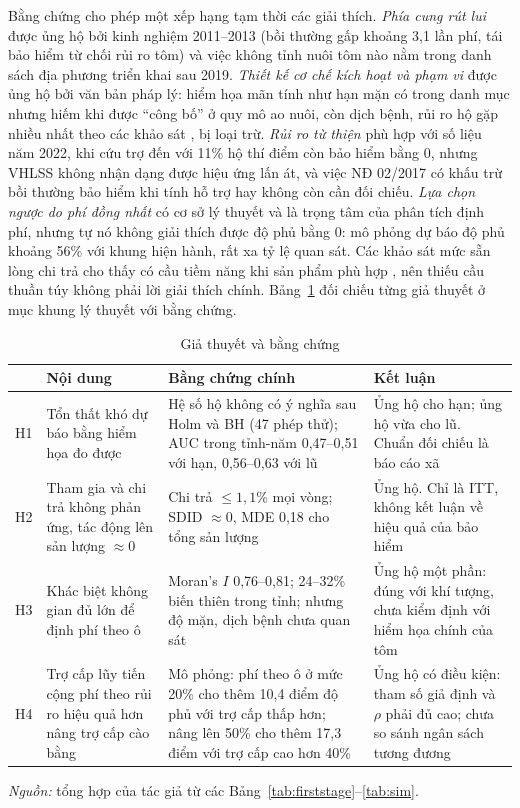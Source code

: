 \documentclass[12pt,a4paper]{article}
\begin{document}
Bằng chứng cho phép một xếp hạng tạm thời các giải thích. \textit{Phía cung rút lui} được ủng hộ bởi kinh nghiệm 2011--2013 (bồi thường gấp khoảng 3,1 lần phí, tái bảo hiểm từ chối rủi ro tôm) và việc không tỉnh nuôi tôm nào nằm trong danh sách địa phương triển khai sau 2019. \textit{Thiết kế cơ chế kích hoạt và phạm vi} được ủng hộ bởi văn bản pháp lý: hiểm họa mãn tính như hạn mặn có trong danh mục nhưng hiếm khi được ``công bố'' ở quy mô ao nuôi, còn dịch bệnh, rủi ro hộ gặp nhiều nhất theo các khảo sát \parencite{kiet2021ruiro,joffre2018}, bị loại trừ. \textit{Rủi ro từ thiện} phù hợp với số liệu năm 2022, khi cứu trợ đến với 11\% hộ thí điểm còn bảo hiểm bằng 0, nhưng VHLSS không nhận dạng được hiệu ứng lấn át, và việc NĐ 02/2017 có khấu trừ bồi thường bảo hiểm khi tính hỗ trợ hay không còn cần đối chiếu. \textit{Lựa chọn ngược do phí đồng nhất} có cơ sở lý thuyết và là trọng tâm của phân tích định phí, nhưng tự nó không giải thích được độ phủ bằng 0: mô phỏng dự báo độ phủ khoảng 56\% với khung hiện hành, rất xa tỷ lệ quan sát. Các khảo sát mức sẵn lòng chi trả cho thấy có cầu tiềm năng khi sản phẩm phù hợp \parencite{nguyenkat2021,tu2025}, nên thiếu cầu thuần túy không phải lời giải thích chính. Bảng~\ref{tab:hyp} đối chiếu từng giả thuyết ở mục khung lý thuyết với bằng chứng.

\begin{table}[!tbp]
\centering\footnotesize
\caption{Giả thuyết và bằng chứng}
\label{tab:hyp}
\begin{tabularx}{\textwidth}{@{}l>{\raggedright\arraybackslash}p{3.7cm}>{\raggedright\arraybackslash}X>{\raggedright\arraybackslash}p{2.5cm}@{}}
\toprule
 & Nội dung & Bằng chứng chính & Kết luận \\
\midrule
H1 & Tổn thất khó dự báo bằng hiểm họa đo được & Hệ số hộ không có ý nghĩa sau Holm và BH (47 phép thử); AUC trong tỉnh-năm 0,47--0,51 với hạn, 0,56--0,63 với lũ & Ủng hộ cho hạn; ủng hộ vừa cho lũ. Chuẩn đối chiếu là báo cáo xã \\
H2 & Tham gia và chi trả không phản ứng, tác động lên sản lượng $\approx 0$ & Chi trả $\leq 1{,}1\%$ mọi vòng; SDID $\approx 0$, MDE 0,18 cho tổng sản lượng & Ủng hộ. Chỉ là ITT, không kết luận về hiệu quả của bảo hiểm \\
H3 & Khác biệt không gian đủ lớn để định phí theo ô & Moran's $I$ 0,76--0,81; 24--32\% biến thiên trong tỉnh; nhưng độ mặn, dịch bệnh chưa quan sát & Ủng hộ một phần: đúng với khí tượng, chưa kiểm định với hiểm họa chính của tôm \\
H4 & Trợ cấp lũy tiến cộng phí theo rủi ro hiệu quả hơn nâng trợ cấp cào bằng & Mô phỏng: phí theo ô ở mức 20\% cho thêm 10,4 điểm độ phủ với trợ cấp thấp hơn; nâng lên 50\% cho thêm 17,3 điểm với trợ cấp cao hơn 40\% & Ủng hộ có điều kiện: tham số giả định và $\rho$ phải đủ cao; chưa so sánh ngân sách tương đương \\
\bottomrule
\end{tabularx}
\begin{minipage}{\textwidth}\footnotesize
\textit{Nguồn:} tổng hợp của tác giả từ các Bảng~\ref{tab:firststage}--\ref{tab:sim}.
\end{minipage}
\end{table}
\end{document}
